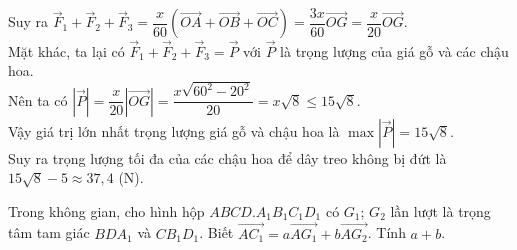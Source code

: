 \begin{bt}
{		Suy ra $\overrightarrow{F}_1 + \overrightarrow{F}_2 +  \overrightarrow{F}_3 = \dfrac{x}{60}(\overrightarrow{OA} + \overrightarrow{OB} + \overrightarrow{OC}) = \dfrac{3x}{60}\overrightarrow{OG} = \dfrac{x}{20}\overrightarrow{OG}$.\\
		Mặt khác, ta lại có $\overrightarrow{F}_1 + \overrightarrow{F}_2 + \overrightarrow{F}_3 =  \overrightarrow{P}$ với $\overrightarrow{P}$ là trọng lượng của giá gỗ và các chậu hoa.\\
		Nên ta  có
		$\left|\overrightarrow{P}\right| =  \dfrac{x}{20}\left|\overrightarrow{OG}\right|
		= \dfrac{x\sqrt{60^2 - 20^2}}{20} 
		=  x\sqrt{8} \leq 15\sqrt{8}$.\\
		Vậy giá trị lớn nhất trọng lượng giá gỗ và chậu hoa là 
		$\max \left|\overrightarrow{P}\right|  = 15\sqrt{8}$.\\
		Suy ra trọng lượng tối đa của  các chậu hoa để dây treo không bị đứt là
		$15\sqrt{8}  - 5 \approx 37{,}4$ (N).
	 }
\end{bt}

\begin{bt}%
	Trong không gian, cho hình hộp $ABCD.A_1B_1C_1D_1$ có $G_1$; $G_2$ lần lượt là trọng tâm tam giác $BDA_1$ và $CB_1D_1$. Biết $\overrightarrow{AC_1}=a\overrightarrow{AG_1}+b\overrightarrow{AG_2}$.  Tính $a+b$.
\end{bt}

